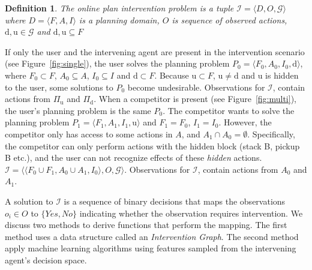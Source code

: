 \documentclass[letterpaper]{article}
\theoremstyle{plain}
\newtheorem{definition}{Definition}
\begin{document}
\theoremstyle{definition}
\begin{definition}
The \textnormal{online plan intervention problem} is a tuple $\mathcal{I} = \langle D, O, \mathcal{G} \rangle$ where $D=\langle F, A, I \rangle$ is a planning domain, 
$O$ is  sequence of observed actions, $\mathrm{d},\mathrm{u} \in \mathcal{G}$ and 
$\mathrm{d}, \mathrm{u} \subseteq F$
\end{definition}
If only the user and the intervening agent are present in the intervention scenario (see Figure~\ref{fig:single}), the user solves the planning problem $P_0=\langle F_0, A_0, I_0,\mathrm{d}\rangle$, where $F_0 \subset F$, $A_0\subseteq A$, $I_0 \subseteq I$ and $\mathrm{d}\subset F$. 
Because $\mathrm{u}\subset F$, $\mathrm{u}\neq \mathrm{d}$ and $\mathrm{u}$ is hidden to the user, some solutions to $P_0$ become undesirable.
Observations for $\mathcal{I}$, contain actions from $\Pi_{\mathrm{u}}$ and $\Pi_{\mathrm{d}}$. 
When a competitor is present (see Figure~\ref{fig:multi}), the user's planning problem is the same $P_0$.
The competitor wants to solve the planning problem $P_1=\langle F_1, A_1, I_1,\mathrm{u}\rangle$ and $F_1=F_0$, $I_1=I_0$. However, the competitor only has access to some actions in $A$, and $A_1 \cap A_0=\emptyset$. 
Specifically, the competitor can only perform actions with the hidden block (stack B, pickup B etc.), and the user can not recognize effects of these \textit{hidden} actions. $\mathcal{I}=\langle \langle F_0\cup F_1, A_0\cup
 A_1, I_0\rangle , O,\mathcal{G}\rangle$.
Observations for $\mathcal{I}$, contain actions from $A_0$ and $A_1$. 


A solution to $\mathcal{I}$ is a sequence of binary decisions that maps the observations $o_i\in O$ to $\lbrace Yes,No\rbrace$ indicating whether the observation requires intervention. We discuss two methods to derive functions that perform the mapping. The first method uses a data structure called an \textit{Intervention Graph}. The second method apply machine learning algorithms using features sampled from the intervening agent's decision space.
\end{document}
